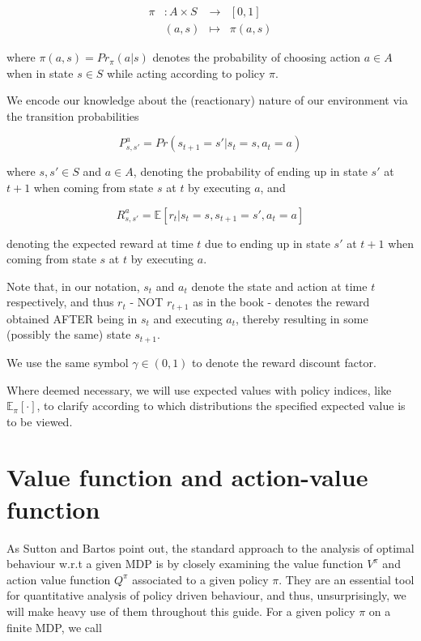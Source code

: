 \documentclass[11pt]{article} %
\begin{document}
\[
	\begin{array}{llll}
		\pi 	& : A \times S 	& \to 	& [0,1] \\
			& (a,s)		& \mapsto	& \pi(a,s)
	\end{array}
\]

where $\pi(a,s) = Pr_{\pi}(a | s)$ denotes the probability of choosing action $a \in A$ when in state $s \in S$ while acting according to policy $\pi$.

We encode our knowledge about the (reactionary) nature of our environment via the transition probabilities

\[
	P_{s,s'}^{a} = Pr(s_{t+1} = s' | s_t = s, a_t = a)
\]
 
where $s,s' \in S$ and $a \in A$, denoting the probability of ending up in state $s'$ at $t+1$ when coming from state $s$ at $t$ by executing $a$, and 

\[
	R_{s,s'}^{a} = \mathbb{E}[r_t | s_t = s, s_{t+1} = s', a_t = a]
\]

denoting the expected reward at time $t$ due to ending up in state $s'$ at $t+1$ when coming from state $s$ at $t$ by executing $a$.

Note that, in our notation, $s_t$ and $a_t$ denote the state and action at time $t$ respectively, and thus $r_t$ - NOT $r_{t+1}$ as in the book - denotes the reward obtained AFTER being in $s_t$ and executing $a_t$, thereby resulting in some (possibly the same) state $s_{t+1}$.

We use the same symbol $\gamma \in (0,1)$ to denote the reward discount factor.

Where deemed necessary, we will use expected values with policy indices, like $\mathbb{E}_{\pi}[\cdot]$, to clarify according to which distributions the specified expected value is to be viewed.

\section{Value function and action-value function}

As Sutton and Bartos point out, the standard approach to the analysis of optimal behaviour w.r.t a given MDP is by closely examining the value function $V^{\pi}$ and action value function $Q^{\pi}$ associated to a given policy $\pi$. They are an essential tool for quantitative analysis of policy driven behaviour, and thus, unsurprisingly, we will make heavy use of them throughout this guide. For a given policy $\pi$ on a finite MDP, we call
\end{document}
